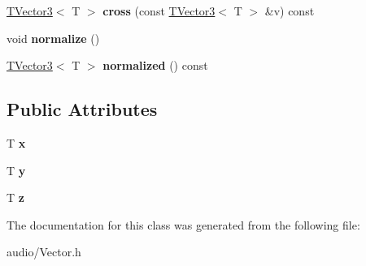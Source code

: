 \begin{DoxyCompactItemize}
\item 
\hyperlink{classAudio_1_1TVector3}{T\+Vector3}$<$ T $>$ {\bfseries cross} (const \hyperlink{classAudio_1_1TVector3}{T\+Vector3}$<$ T $>$ \&v) const \hypertarget{classAudio_1_1TVector3_a6175554a61a08c5f0936313bcf316cd4}{}\label{classAudio_1_1TVector3_a6175554a61a08c5f0936313bcf316cd4}

\item 
void {\bfseries normalize} ()\hypertarget{classAudio_1_1TVector3_a0b09e33f2dd2d80e6681963776f2e1c9}{}\label{classAudio_1_1TVector3_a0b09e33f2dd2d80e6681963776f2e1c9}

\item 
\hyperlink{classAudio_1_1TVector3}{T\+Vector3}$<$ T $>$ {\bfseries normalized} () const \hypertarget{classAudio_1_1TVector3_ac3d3685331ecc9b7d8c3b1ecdb708838}{}\label{classAudio_1_1TVector3_ac3d3685331ecc9b7d8c3b1ecdb708838}

\end{DoxyCompactItemize}
\subsection*{Public Attributes}
\begin{DoxyCompactItemize}
\item 
T {\bfseries x}\hypertarget{classAudio_1_1TVector3_a75d00b803c6dcd37f0366a9526a49fbb}{}\label{classAudio_1_1TVector3_a75d00b803c6dcd37f0366a9526a49fbb}

\item 
T {\bfseries y}\hypertarget{classAudio_1_1TVector3_a4ce29cfdb9bd4b14d8d1f66640a1a671}{}\label{classAudio_1_1TVector3_a4ce29cfdb9bd4b14d8d1f66640a1a671}

\item 
T {\bfseries z}\hypertarget{classAudio_1_1TVector3_af15db62ac282b2c5d542dda1fbcbc9ff}{}\label{classAudio_1_1TVector3_af15db62ac282b2c5d542dda1fbcbc9ff}

\end{DoxyCompactItemize}


The documentation for this class was generated from the following file\+:\begin{DoxyCompactItemize}
\item 
audio/Vector.\+h\end{DoxyCompactItemize}
